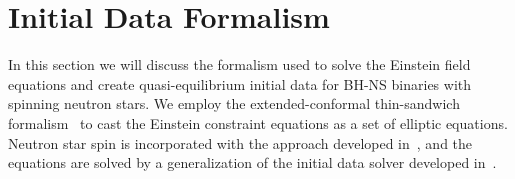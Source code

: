 \section{Initial Data Formalism}
\label{sec:BH-NSIDF}



In this section we will discuss the formalism used to solve the
Einstein field equations and create quasi-equilibrium initial data for
BH-NS binaries with spinning neutron stars. We employ the
extended-conformal thin-sandwich
formalism~\citep{Pfeiffer2003b,York1999} to cast the Einstein
constraint equations as a set of elliptic equations. Neutron star
spin is incorporated with the approach developed
in~\cite{Tichy:2011gw}, and the equations are solved by a
generalization of the initial data solver developed
in~\cite{FoucartEtAl:2008}.


